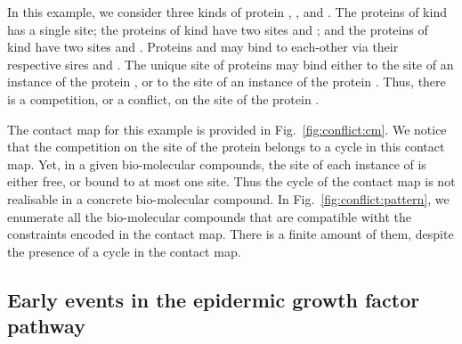 \documentclass{entcs}
\begin{document}
In this example, we consider three kinds of protein , , and . The proteins of kind  has a single site; the proteins of kind  have two sites  and ; and the proteins of kind  have two sites  and . Proteins  and  may bind to each-other via their respective sires  and .
The unique site of proteins  may bind either to the site  of an instance of the protein , or to the site  of an instance of the protein . Thus, there is a competition, or a conflict, on the site of the protein .

The contact map for this example is provided in Fig.~\ref{fig:conflict:cm}.
We notice that the competition on the site of the protein  belongs to a cycle in this contact map. Yet, in a given bio-molecular compounds,
the site of each instance of  is either free, or bound to at most one site. Thus the cycle of the contact map is not realisable
in a concrete bio-molecular compound. In Fig.~\ref{fig:conflict:pattern}, we enumerate all the bio-molecular compounds that are compatible witht the constraints encoded in the contact map. There is a finite amount of them, despite the presence of a cycle in the contact map.


\subsection{Early events in the epidermic growth factor pathway}

\label{sec:egfr}
\end{document}
